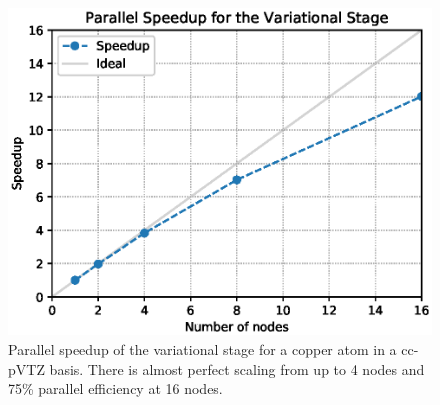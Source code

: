 \documentclass[%
reprint,
 superscriptaddress,
 amsmath,amssymb,
 aps,
]{revtex4-1}
\begin{document}
\begin{figure}[h]
  \includegraphics[width=\linewidth]{scalability/var}
  \caption{Parallel speedup of the variational stage for a copper atom in a cc-pVTZ basis.
There is almost perfect scaling from up to 4 nodes and 75\% parallel efficiency at 16 nodes.
}
  \label{fig:paravar}
\end{figure}
 
\end{document}
